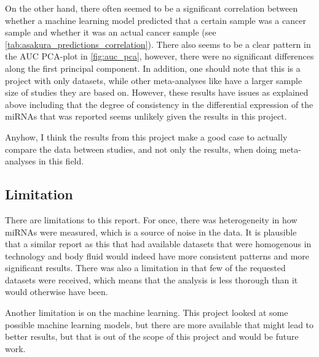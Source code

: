On the other hand, there often seemed to be a significant correlation between whether a machine learning model predicted that a certain sample was a cancer sample and whether it was an actual cancer sample (see \autoref{tab:asakura_predictions_correlation}). There also seems to be a clear pattern in the AUC PCA-plot in \autoref{fig:auc_pca}, however, there were no significant differences along the first principal component.
In addition, one should note that this is a project with only \studylen {} datasets, while other meta-analyses like \citet{mirna_replicate_sequences} have a larger sample size of studies they are based on. However, these results have issues as explained above including that the degree of consistency in the differential expression of the miRNAs that was reported seems unlikely given the results in this project.


Anyhow, I think the results from this project make a good case to actually compare the data between studies, and not only the results, when doing meta-analyses in this field.

\subsection{Limitation}

There are limitations to this report. For once, there was heterogeneity in how miRNAs were measured, which is a source of noise in the data. It is plausible that a similar report as this that had available datasets that were homogenous in technology and body fluid would indeed have more consistent patterns and more significant results. There was also a limitation in that few of the requested datasets were received, which means that the analysis is less thorough than it would otherwise have been. 

Another limitation is on the machine learning. This project looked at some possible machine learning models, but there are more available that might lead to better results, but that is out of the scope of this project and would be future work.

